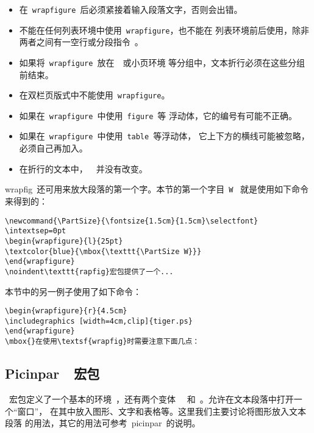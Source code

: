 \begin{itemize}
	\item 在~\texttt{wrapfigure}~后必须紧接着输入段落文字，否则会出错。
	\item 不能在任何列表环境中使用~\texttt{wrapfigure}，也不能在
	列表环境前后使用，除非两者之间有一空行或分段指令~。
	\item 如果将~\texttt{wrapfigure}~放在~~或小页环境
	等分组中，文本折行必须在这些分组前结束。
	\item 在双栏页版式中不能使用~\texttt{wrapfigure}。
	\item 如果在~\texttt{wrapfigure}~中使用~\texttt{figure}~等
	浮动体，它的编号有可能不正确。
	\item 如果在~\texttt{wrapfigure}~中使用~\texttt{table}~等浮动体，
	它上下方的横线可能被忽略，必须自己再加入。
	\item 在折行的文本中，~~并没有改变。
\end{itemize}

\textsf{wrapfig}~还可用来放大段落的第一个字。本节的第一个字目~\texttt{W}~
就是使用如下命令来得到的：
\begin{Verbatim}[xleftmargin=1cm]
\newcommand{\PartSize}{\fontsize{1.5cm}{1.5cm}\selectfont}
\intextsep=0pt
\begin{wrapfigure}{l}{25pt}
\textcolor{blue}{\mbox{\texttt{\PartSize W}}}
\end{wrapfigure}
\noindent\texttt{rapfig}宏包提供了一个...
\end{Verbatim}

本节中的另一例子使用了如下命令：
\begin{Verbatim}[xleftmargin=1cm]
\begin{wrapfigure}{r}{4.5cm}
\includegraphics [width=4cm,clip]{tiger.ps}
\end{wrapfigure}
\mbox{}在使用\textsf{wrapfig}时需要注意下面几点：
\end{Verbatim}

\subsection{Picinpar~~宏包}\label{ssec:picinpar}

~宏包定义了一个基本的环境~，还有两个变体
~~和~。允许在文本段落中打开一个``窗口''，
在其中放入图形、文字和表格等。这里我们主要讨论将图形放入文本段落
的用法，其它的用法可参考~\textsf{picinpar}~的说明。


